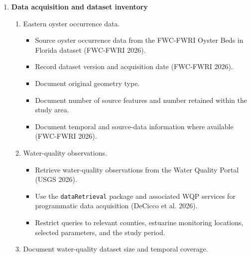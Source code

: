 \documentclass[
  letterpaper,
  DIV=11,
  numbers=noendperiod]{scrartcl}
\providecommand{\tightlist}{%
  \setlength{\itemsep}{0pt}\setlength{\parskip}{0pt}}
\begin{document}
\begin{enumerate}
\begin{enumerate}
    \begin{itemize}
    \tightlist
    \item
      A comparable geographic extent will support subsequent spatial
      comparison with the HSI developed for PBS (Geselbracht et al.
      2024).
    \end{itemize}
  \item
    Develop a study-area map.

    \begin{itemize}
    \tightlist
    \item
      PBS boundary (FDEP 2005).
    \item
      Major embayments (Geselbracht et al. 2024).
    \item
      Oyster occurrence locations (FWC-FWRI 2026).
    \item
      Environmental monitoring locations (USGS 2026).
    \end{itemize}
  \end{enumerate}
\item
  \textbf{Data acquisition and dataset inventory}

  \begin{enumerate}
  \def\labelenumii{\arabic{enumii}.}
  \tightlist
  \item
    Eastern oyster occurrence data.

    \begin{itemize}
    \tightlist
    \item
      Source oyster occurrence data from the FWC-FWRI Oyster Beds in
      Florida dataset (FWC-FWRI 2026).
    \item
      Record dataset version and acquisition date (FWC-FWRI 2026).
    \item
      Document original geometry type.
    \item
      Document number of source features and number retained within the
      study area.
    \item
      Document temporal and source-data information where available
      (FWC-FWRI 2026).
    \end{itemize}
  \item
    Water-quality observations.

    \begin{itemize}
    \tightlist
    \item
      Retrieve water-quality observations from the Water Quality Portal
      (USGS 2026).
    \item
      Use the \texttt{dataRetrieval} package and associated WQP services
      for programmatic data acquisition (DeCicco et al. 2026).
    \item
      Restrict queries to relevant counties, estuarine monitoring
      locations, selected parameters, and the study period.
    \end{itemize}
  \item
    Document water-quality dataset size and temporal coverage.


\end{enumerate}
\end{enumerate}
\end{document}
